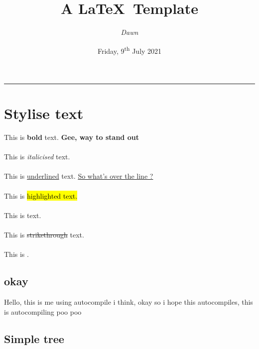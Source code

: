 \documentclass[11pt]{article}
\title{A \textbf{\LaTeX}\ Template}
\author{\textit{Dawn}}
\date{Friday, 9\textsuperscript{th} July 2021}
\begin{document}
\maketitle
\par\rule{\textwidth}{1pt}
\tableofcontents

\section{Stylise text}
This is \textbf{bold} text. \textbf{Gee, way to stand out}\\\\
This is \textit{italicised} text.\\\\
This is \underline{underlined} text. \underline{So what's over the line ?}\\\\
This is \hl{highlighted text.}\\\\
This is  text. \\\\
This is \sout{strikethrough} text.\\\\
This is .
\subsection{okay}
Hello, this is me using autocompile i think, okay so
i hope this autocompiles,
this is  autocompiling
poo poo
\subsection{Simple tree}
\end{document}
